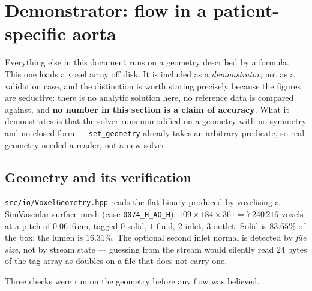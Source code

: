 \documentclass[11pt,a4paper]{article}
\newcommand{\code}[1]{\texttt{\small #1}}
\begin{document}
\section{Demonstrator: flow in a patient-specific aorta}
\label{sec:aorta}

Everything else in this document runs on a geometry described by a formula. This
one loads a voxel array off disk. It is included as a \emph{demonstrator}, not as
a validation case, and the distinction is worth stating precisely because the
figures are seductive: there is no analytic solution here, no reference data is
compared against, and \textbf{no number in this section is a claim of accuracy}.
What it demonstrates is that the solver runs unmodified on a geometry with no
symmetry and no closed form --- \code{set\_geometry} already takes an arbitrary
predicate, so real geometry needed a reader, not a new solver.

\subsection{Geometry and its verification}
\label{sec:aortageom}

\code{src/io/VoxelGeometry.hpp} reads the flat binary produced by voxelising a
SimVascular surface mesh (case \code{0074\_H\_AO\_H}): $109\times184\times361 =
7\,240\,216$ voxels at a pitch of $0.0616$\,cm, tagged $0$ solid, $1$ fluid,
$2$ inlet, $3$ outlet. Solid is $83.65\%$ of the box; the lumen is $16.31\%$.
The optional second inlet normal is detected by \emph{file size}, not by stream
state --- guessing from the stream would silently read 24 bytes of the tag array
as doubles on a file that does not carry one.

Three checks were run on the geometry before any flow was believed.
\end{document}
